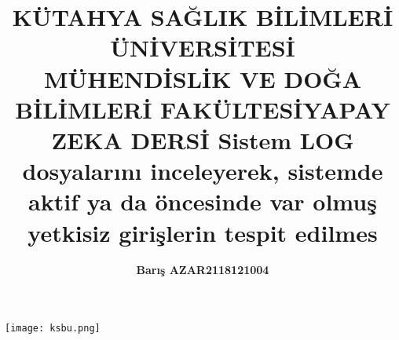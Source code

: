 \documentclass[12pt,a4paper]{article}
\title{\bf\fontsize{12pt}{14pt}\selectfont KÜTAHYA SAĞLIK BİLİMLERİ ÜNİVERSİTESİ \\ MÜHENDİSLİK VE DOĞA BİLİMLERİ FAKÜLTESİ}
\begin{document}
	
	\maketitle
	\begin{center}
			\texttt{[image: ksbu.png]}
	\end{center}
             
	        
	\begin{center}
		\vspace{1cm} %
	\end{center}
	\begin{center}
	\title{\bf\fontsize{12pt}{14pt}\selectfont YAPAY ZEKA DERSİ }
	\end{center}
		\begin{center}
		\title{\bf\fontsize{12pt}{14pt}\selectfont Sistem LOG dosyalarını inceleyerek, sistemde aktif ya da öncesinde var
olmuş yetkisiz girişlerin tespit edilmes}
	\end{center}
	\begin{center}
	\vspace{1cm} %
	\end{center}
	\begin{center}
		
	\author{\bf\fontsize{12pt}{14pt}Barış AZAR\hspace{2cm}2118121004}
	
	\begin{center}
	\vspace{1cm} %
	\end{center}
	
	\end{center}
  \newpage
\end{document}
